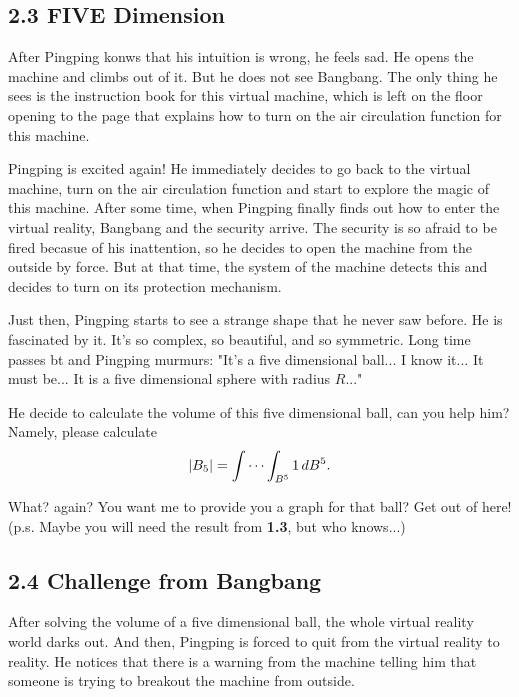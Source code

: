 \documentclass[12pt]{article}
\begin{document}
\subsection*{2.3 FIVE Dimension}
\par After Pingping konws that his intuition is wrong, he feels sad. He opens the machine and climbs out of it. But 
he does not see Bangbang. The only thing he sees is the instruction book for this virtual machine, which is left 
on the floor opening to the page that explains how to turn on the air circulation function for this machine. 

\par Pingping is excited again! He immediately decides to go back to the virtual machine, turn on the air 
circulation function and start to explore the magic of this machine. After some time, when Pingping finally 
finds out how to enter the virtual reality, Bangbang and the security arrive. The security is so afraid to be 
fired becasue of his inattention, so he decides to open the machine from the outside by force. But at that time,
the system of the machine detects this and decides to turn on its protection mechanism. 

\par Just then, Pingping starts to see a strange shape that he never saw before. He is fascinated by it. It's so 
complex, so beautiful, and so symmetric. Long time passes bt and Pingping murmurs: "It's a five dimensional ball... I 
know it... It must be... It is a five dimensional sphere with radius $R$..."

\par He decide to calculate the volume of this five dimensional ball, can you help him? Namely, please calculate 
\begin{equation*}
    \abs{B_5} = \idotsint_{B^5}1 \,dB^5. 
\end{equation*}

\par What? again? You want me to provide you a graph for that ball? Get out of here!\\
\hfill (p.s. Maybe you will need the result from \textbf{1.3}, but who knows...)

\subsection*{2.4 Challenge from Bangbang}
\par After solving the volume of a five dimensional ball, the whole virtual reality world darks out. And then, 
Pingping is forced to quit from the virtual reality to reality. He notices that there is a warning from the machine 
telling him that someone is trying to breakout the machine from outside. 
\end{document}
